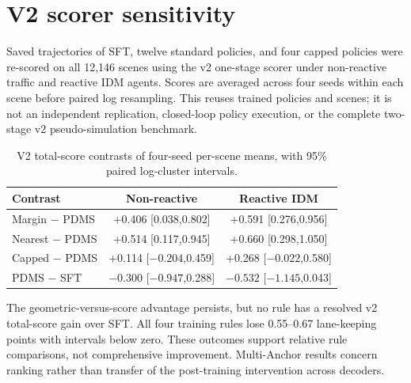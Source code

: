 \documentclass[10pt,letterpaper]{article}
\begin{document}
\section{V2 scorer sensitivity}
Saved trajectories of SFT, twelve standard policies, and four capped policies were re-scored on all 12,146 scenes using the v2 one-stage scorer under non-reactive traffic and reactive IDM agents. Scores are averaged across four seeds within each scene before paired log resampling. This reuses trained policies and scenes; it is not an independent replication, closed-loop policy execution, or the complete two-stage v2 pseudo-simulation benchmark.
\begin{table}[H]
\centering\caption{V2 total-score contrasts of four-seed per-scene means, with 95\% paired log-cluster intervals.}
\begin{tabular}{lcc}\toprule
Contrast & Non-reactive & Reactive IDM\\\midrule
Margin $-$ PDMS & +0.406 [0.038,0.802] & +0.591 [0.276,0.956]\\
Nearest $-$ PDMS & +0.514 [0.117,0.945] & +0.660 [0.298,1.050]\\
Capped $-$ PDMS & +0.114 [$-0.204$,0.459] & +0.268 [$-0.022$,0.580]\\
PDMS $-$ SFT & $-0.300$ [$-0.947$,0.288] & $-0.532$ [$-1.145$,0.043]\\\bottomrule
\end{tabular}
\end{table}
The geometric-versus-score advantage persists, but no rule has a resolved v2 total-score gain over SFT. All four training rules lose 0.55--0.67 lane-keeping points with intervals below zero. These outcomes support relative rule comparisons, not comprehensive improvement. Multi-Anchor results concern ranking rather than transfer of the post-training intervention across decoders.
\end{document}
